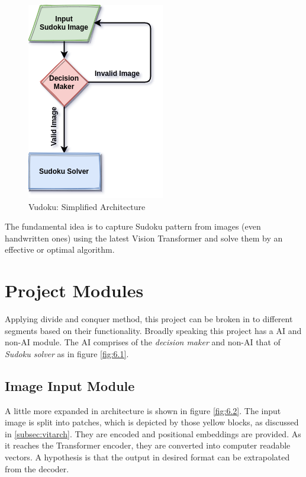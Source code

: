 \documentclass[12pt, a4paper]{report}
\begin{document}
\begin{figure}[!htbp]
    \centering
    \includegraphics[height=0.5\textwidth]{vudoku_arch01.png}
    \caption[Vudoku: Simplified Architecture]{Vudoku: Simplified Architecture}
    \label{fig:6.1}
\end{figure}

The fundamental idea is to capture Sudoku pattern from images (even handwritten ones) using the latest Vision Transformer and solve them by an effective or optimal algorithm.

\section{Project Modules}
\label{sec:prjtmod}

\hspace{0.5cm} Applying divide and conquer method, this project can be broken in to different segments based on their functionality. Broadly speaking this project has a AI and non-AI module. The AI comprises of the \emph{decision maker} and non-AI that of \emph{Sudoku solver} as in figure \eqref{fig:6.1}.

\subsection{Image Input Module}
\label{subsec:ipvit}

\hspace{0.5cm} A little more expanded in architecture is shown in figure \eqref{fig:6.2}. The input image is split into patches, which is depicted by those yellow blocks, as discussed in \eqref{subsec:vitarch}. They are encoded and positional embeddings are provided. As it reaches the Transformer encoder, they are converted into computer readable vectors. A hypothesis is that the output in desired format can be extrapolated from the decoder.
\end{document}
